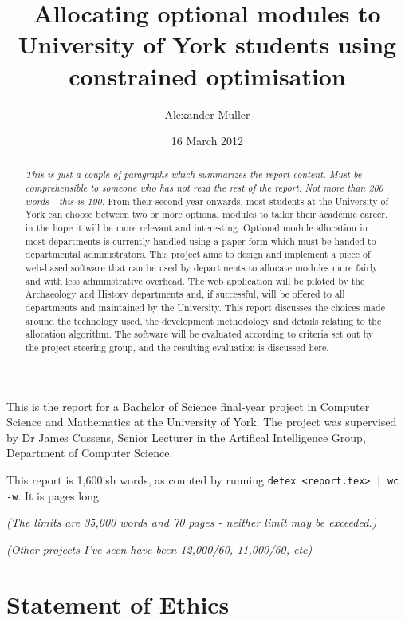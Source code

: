 \documentclass[]{article}
\title{Allocating optional modules to University of York students using constrained optimisation}
\author{Alexander Muller}
\date{16 March 2012}
\begin{document}
\ifpdf
{}
\else
{}
\fi

\maketitle

This is the report for a Bachelor of Science final-year project in Computer Science and Mathematics at the University of York. The project was supervised by Dr James Cussens, Senior Lecturer in the Artifical Intelligence Group, Department of Computer Science.

This report is 1,600ish words, as counted by running \verb+detex <report.tex> | wc -w+. It is \pageref{LastPage} pages long.

\textit{(The limits are 35,000 words and 70 pages - neither limit may be exceeded.)}

\textit{(Other projects I've seen have been 12,000/60, 11,000/60, etc)}

\newpage

\begin{abstract}
  \textit{This is \emph{just} a couple of paragraphs which summarizes the report content. Must be comprehensible to someone who has not read the rest of the report.}
  \textit{Not more than 200 words - this is 190.}
  From their second year onwards, most students at the University of York can  choose between two or more optional modules to tailor their academic career, in the hope it will be more relevant and interesting. Optional module allocation in most departments is currently handled using a paper form which must be handed to departmental administrators. This project aims to design and implement a piece of web-based software that can be used by departments to allocate modules more fairly and with less administrative overhead.
  The web application will be piloted by the Archaeology and History departments and, if successful, will be offered to all departments and maintained by the University.
  This report discusses the choices made around the technology used, the development methodology and details relating to the allocation algorithm.
  The software will be evaluated according to criteria set out by the project steering group, and the resulting evaluation is discussed here.
\end{abstract}

\newpage
\tableofcontents
\newpage

\section{Statement of Ethics}
\end{document}
